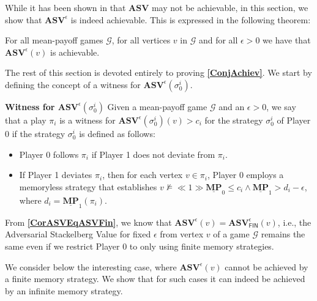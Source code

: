 While it has been shown in \cite{FGR20} that \textbf{$\mathbf{ASV}$} may not be achievable, in this section, we show that $\mathbf{ASV}^{\epsilon}$ is indeed achievable. This is expressed in the following theorem:
\begin{theorem}
    \label{ConjAchiev}
    For all mean-payoff games $\mathcal{G}$, for all vertices $v$ in $\mathcal{G}$ and for all $\epsilon > 0$ we have that $\mathbf{ASV}^{\epsilon}(v)$ is achievable.
\end{theorem}

The rest of this section is devoted entirely to proving \textbf{\cref{ConjAchiev}}. We start by defining the concept of a witness for $\mathbf{ASV}^{\epsilon}(\sigma_0^i)$.

\textbf{Witness for $\mathbf{ASV}^{\epsilon}(\sigma_0^i)$}
Given a mean-payoff game $\mathcal{G}$ and an $\epsilon > 0$, we say that a play $\pi_i$ is a witness for $\mathbf{ASV}^{\epsilon}(\sigma_0^i)(v) > c_i$ for the strategy $\sigma_0^i$ of Player 0 if the strategy $\sigma_0^i$ is defined as follows:
\begin{itemize}
    \item Player 0 follows $\pi_i$ if Player 1 does not deviate from $\pi_i$.
    \item If Player 1 deviates $\pi_i$, then for each vertex $v \in \pi_i$, Player 0 employs a memoryless strategy that establishes $v \nvDash \ll 1 \gg \underline{\mathbf{MP}}_0 \leqslant c_i \land \underline{\mathbf{MP}}_1 > d_i - \epsilon$, where $d_i = \underline{\mathbf{MP}}_1(\pi_i)$.
\end{itemize}

From \textbf{\cref{CorASVEqASVFin}}, we know that $\mathbf{ASV}^{\epsilon}(v) = \mathbf{ASV}^{\epsilon}_{\mathsf{FIN}}(v)$, i.e., the Adversarial Stackelberg Value for fixed $\epsilon$ from vertex $v$ of a game $\mathcal{G}$ remains the same even if we restrict Player 0 to only using finite memory strategies.


We consider below the interesting case, where $\mathbf{ASV}^{\epsilon}(v)$ cannot be achieved by a finite memory strategy.
We show that for such cases it can indeed be achieved by an infinite memory strategy.
 

